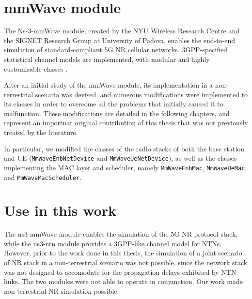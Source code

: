 \section{mmWave module}

The Ns-3-mmWave module, created by the NYU Wireless Research Centre and the SIGNET Research Group at University of Padova, enables the end-to-end simulation of standard-compliant 5G \ac{NR} cellular networks. \ac{3GPP}-specified statistical channel models are implemented, with modular and highly customisable classes \cite{e2e-sim-mmwave}.

After an initial study of the mmWave module, its implementation in a non-terrestrial scenario was devised, and numerous modifications were implemented to its classes in order to overcome all the problems that initially caused it to malfunction. These modifications are detailed in the following chapters, and represent an importnat original contribution of this thesis that was not previously treated by the literature. 

In particular, we modified the classes of the radio stacks of both the base station and \ac{UE} (\texttt{MmWaveEnbNetDevice} and \texttt{MmWaveUeNetDevice}), as well as the classes implementing the MAC layer and scheduler, namely \texttt{MmWaveEnbMac}, \texttt{MmWaveUeMac}, and \texttt{MmWaveMacScheduler}.

\section{Use in this work}
\paragraph{}
The ns3-mmWave module enables the simulation of the 5G \ac{NR} protocol stack, while the ns3-ntn module \cite{Sandri_2023} provides a \ac{3GPP}-like channel model for \ac{NTN}s. However, prior to the work done in this thesis, the simulation of a joint scenario of \ac{NR} stack in a non-terrestrial scenario was not possible, since the network stack was not designed to accomodate for the propagation delays exhibited by \ac{NTN} links.
The two modules were not able to operate in conjunction. Our work made non-terrestrial \ac{NR} simulation possible.



